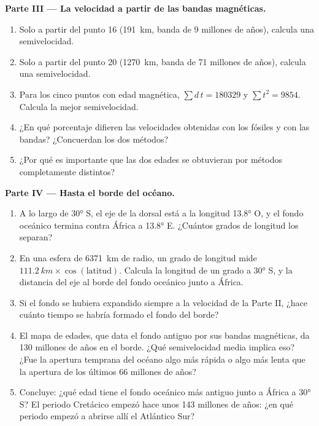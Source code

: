 \begin{problem}
\medskip
\noindent\textbf{Parte III --- La velocidad a partir de las bandas magnéticas.}
\begin{enumerate}[resume]
  \item Solo a partir del punto 16 (\qty{191}{km}, banda de 9 millones de
        años), calcula una semivelocidad.
  \item Solo a partir del punto 20 (\qty{1270}{km}, banda de 71 millones de
        años), calcula una semivelocidad.
  \item Para los cinco puntos con edad magnética, $\sum d\,t = \num{180329}$ y
        $\sum t^2 = \num{9854}$. Calcula la mejor semivelocidad.
  \item ¿En qué porcentaje difieren las velocidades obtenidas con los fósiles
        y con las bandas? ¿Concuerdan los dos métodos?
  \item ¿Por qué es importante que las dos edades se obtuvieran por métodos
        completamente distintos?
\end{enumerate}

\medskip
\noindent\textbf{Parte IV --- Hasta el borde del océano.}
\begin{enumerate}[resume]
  \item A lo largo de \ang{30} S, el eje de la dorsal está a la longitud
        \ang{13.8} O, y el fondo oceánico termina contra África a
        \ang{13.8} E. ¿Cuántos grados de longitud los separan?
  \item En una esfera de \qty{6371}{km} de radio, un grado de longitud
        mide $\qty{111.2}{km} \times \cos(\text{latitud})$. Calcula la
        longitud de un grado a \ang{30} S, y la distancia del eje al borde
        del fondo oceánico junto a África.
  \item Si el fondo se hubiera expandido siempre a la velocidad de la
        Parte II, ¿hace cuánto tiempo se habría formado el fondo del borde?
  \item El mapa de edades, que data el fondo antiguo por sus bandas
        magnéticas, da \num{130} millones de años en el borde. ¿Qué
        semivelocidad media implica eso? ¿Fue la apertura temprana del océano
        algo más rápida o algo más lenta que la apertura de los últimos 66
        millones de años?
  \item Concluye: ¿qué edad tiene el fondo oceánico más antiguo junto a
        África a \ang{30} S? El periodo Cretácico empezó hace unos \num{143}
        millones de años: ¿en qué periodo empezó a abrirse allí el Atlántico
        Sur?
\end{enumerate}
\end{problem}
